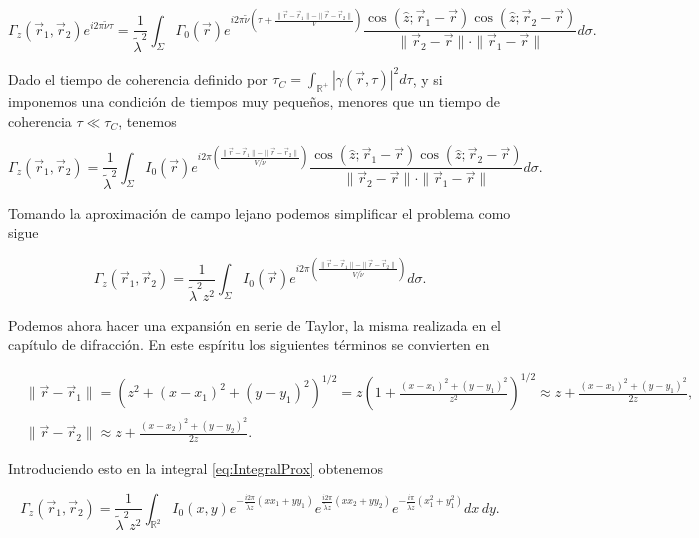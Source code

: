		\begin{equation}
			\Gamma_z(\vec{r}_1,\vec{r}_2)e^{i2\pi\tilde{\nu}\tau} = \frac{1}{\tilde{\lambda}^2} \int_{\Sigma} \Gamma_0(\vec{r})e^{i2\pi\tilde{\nu} \left( \tau + \frac{\|\vec{r} - \vec{r}_1\| - \|\vec{r}-\vec{r}_2\|}{V} \right) } \frac{\cos \left(\hat{z};\vec{r}_1-\vec{r}\right) \cos\left(\hat{z}; \vec{r}_2 - \vec{r} \right) }{\|\vec{r}_2-\vec{r}\|\cdot \|\vec{r}_1 - \vec{r}\|} d\sigma .
		\end{equation}

		Dado el tiempo de coherencia definido por $\tau_C = \int_{\mathbb{R}^+}| \gamma(\vec{r},\tau) |^2 d\tau$, y si imponemos una condición de tiempos muy pequeños, menores que un tiempo de coherencia $\tau \ll \tau_C$, tenemos

		\begin{equation}
			\Gamma_z(\vec{r}_1,\vec{r}_2) = \frac{1}{\tilde{\lambda}^2}\int_{\Sigma}I_0(\vec{r})e^{i2\pi \left( \frac{\|\vec{r}-\vec{r}_1\| - \|\vec{r} - \vec{r}_2\|}{V/\tilde{\nu}} \right)} \frac{\cos \left(\hat{z};\vec{r}_1-\vec{r}\right) \cos\left(\hat{z}; \vec{r}_2 - \vec{r} \right) }{\|\vec{r}_2-\vec{r}\|\cdot \|\vec{r}_1 - \vec{r}\|} d\sigma .
		\end{equation}

		Tomando la aproximación de campo lejano podemos simplificar el problema como sigue

		\begin{equation}\label{eq:IntegralProx}
			\Gamma_z(\vec{r}_1,\vec{r}_2) = \frac{1}{\tilde{\lambda}^2 z^2} \int_{\Sigma} I_0(\vec{r}) e^{i2\pi \left( \frac{\|\vec{r}-\vec{r}_1\| - \|\vec{r} - \vec{r}_2\|}{V/\tilde{\nu}} \right)} d\sigma .
		\end{equation}

		Podemos ahora hacer una expansión en serie de Taylor, la misma realizada en el capítulo de difracción. En este espíritu los siguientes términos se convierten en

		\begin{align}
			& \|\vec{r} - \vec{r}_1\| = \left( z^2 + (x-x_1)^2 + (y-y_1)^2 \right)^{1/2} = z \left(1 + \frac{(x-x_1)^2 + (y-y_1)^2}{z^2}\right)^{1/2} \approx z + \frac{(x-x_1)^2 + (y-y_1)^2}{2z},\\
			& \|\vec{r}-\vec{r}_2\| \approx z + \frac{(x-x_2)^2 + (y-y_2)^2}{2z}.
		\end{align}

		Introduciendo esto en la integral \eqref{eq:IntegralProx} obtenemos

		\begin{equation}
			\Gamma_z (\vec{r}_1,\vec{r}_2) = \frac{1}{\tilde{\lambda}^2 z^2}\int_{\mathbb{R}^2}I_0(x,y)e^{-\frac{i2\pi}{\tilde{\lambda}z}\left(xx_1 + yy_1\right)}e^{\frac{i2\pi}{\tilde{\lambda} z}(xx_2 + yy_2)} e^{-\frac{i\pi}{\tilde{\lambda}z}(x_1^2 + y_1^2)}dx\,dy.
		\end{equation}

